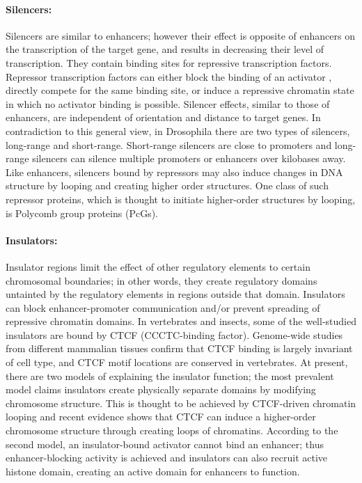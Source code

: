 \documentclass[12pt,]{krantz}
\let\oldparagraph\paragraph
\renewcommand{\paragraph}[1]{\oldparagraph{#1}\mbox{}}
\begin{document}
\hypertarget{silencers}{%
\paragraph{Silencers:}\label{silencers}}

Silencers are similar to enhancers; however their effect is
opposite of enhancers on the transcription of the target gene, and results in
decreasing their level of transcription. They contain binding sites for
repressive transcription factors. Repressor transcription factors can either
block the binding of an activator , directly compete for the same binding site,
or induce a repressive chromatin state in which no activator binding is
possible. Silencer effects, similar to those of enhancers, are independent of
orientation and distance to target genes. In contradiction to this general view,
in Drosophila there are two types of silencers, long-range and short-range.
Short-range silencers are close to promoters and long-range silencers can
silence multiple promoters or enhancers over kilobases away. Like
enhancers, silencers bound by repressors may also induce changes in DNA
structure by looping and creating higher order structures. One class of
such repressor proteins, which is thought to initiate higher-order structures by
looping, is Polycomb group proteins (PcGs).

\hypertarget{insulators}{%
\paragraph{Insulators:}\label{insulators}}

Insulator regions limit the effect of other regulatory elements
to certain chromosomal boundaries; in other words, they create regulatory
domains untainted by the regulatory elements in regions outside that domain.
Insulators can block enhancer-promoter communication and/or prevent spreading of
repressive chromatin domains. In vertebrates and insects, some of the
well-studied insulators are bound by CTCF (CCCTC-binding factor).
Genome-wide studies from different mammalian tissues confirm that CTCF binding
is largely invariant of cell type, and CTCF motif locations are conserved in
vertebrates. At present, there are two models of explaining the insulator
function; the most prevalent model claims insulators create physically separate
domains by modifying chromosome structure. This is thought to be achieved by
CTCF-driven chromatin looping and recent evidence shows that CTCF can induce a
higher-order chromosome structure through creating loops of chromatins.
According to the second model, an insulator-bound activator cannot bind an
enhancer; thus enhancer-blocking activity is achieved and insulators can also
recruit active histone domain, creating an active domain for enhancers to
function.
\end{document}

